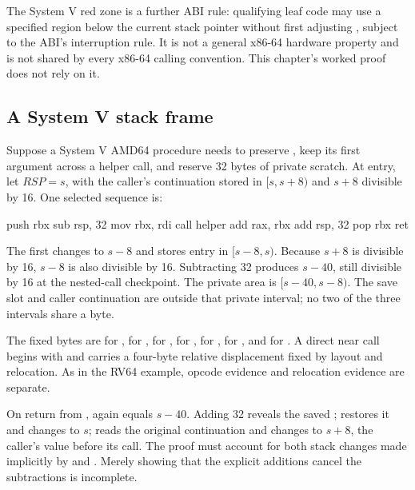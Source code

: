 The System V red zone is a further ABI rule: qualifying leaf code may use a
specified region below the current stack pointer without first adjusting
, subject to the ABI's interruption rule. It is not a general x86-64
hardware property and is not shared by every x86-64 calling convention. This
chapter's worked proof does not rely on it.

\subsection{A System V stack frame}

Suppose a System V AMD64 procedure needs to preserve , keep its first
argument across a helper call, and reserve 32 bytes of private scratch. At
entry, let \(RSP=s\), with the caller's continuation stored in \([s,s+8)\)
and \(s+8\) divisible by 16. One selected sequence is:

\begin{codelisting}[language={},caption={A selected System V AMD64 non-leaf frame}]
    push rbx
    sub  rsp, 32
    mov  rbx, rdi
    call helper
    add  rax, rbx
    add  rsp, 32
    pop  rbx
    ret
\end{codelisting}

The  first changes  to \(s-8\) and stores entry
 in \([s-8,s)\). Because \(s+8\) is divisible by 16, \(s-8\) is
also divisible by 16. Subtracting 32 produces \(s-40\), still divisible by
16 at the nested-call checkpoint. The private area is \([s-40,s-8)\).
The save slot and caller continuation are outside that private interval; no
two of the three intervals share a byte.

The fixed bytes are  for ,
 for ,  for
,  for ,
 for ,  for
, and  for . A direct near call begins with
 and carries a four-byte relative displacement fixed by layout and
relocation. As in the RV64 example, opcode evidence and relocation evidence
are separate.

On return from ,  again equals \(s-40\). Adding 32
reveals the saved ;  restores it and changes 
to \(s\);  reads the original continuation and changes 
to \(s+8\), the caller's value before its call. The proof must account for
both stack changes made implicitly by  and . Merely
showing that the explicit additions cancel the subtractions is incomplete.

